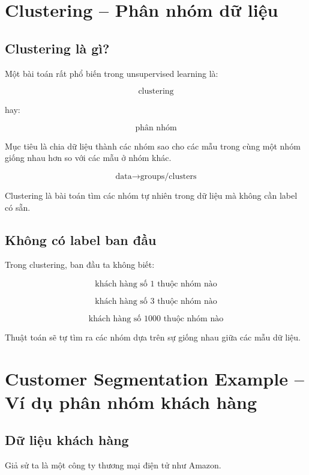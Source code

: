 \section{Clustering -- Phân nhóm dữ liệu}

\subsection{Clustering là gì?}

Một bài toán rất phổ biến trong unsupervised learning là:

\[
    \text{clustering}
\]

hay:

\[
    \text{phân nhóm}
\]

Mục tiêu là chia dữ liệu thành các nhóm sao cho các mẫu trong cùng một nhóm giống nhau hơn so với các mẫu ở nhóm khác.

\[
    \text{data}
    \rightarrow
    \text{groups/clusters}
\]

\begin{ghinho}
Clustering là bài toán tìm các nhóm tự nhiên trong dữ liệu mà không cần label có sẵn.
\end{ghinho}

\subsection{Không có label ban đầu}

Trong clustering, ban đầu ta không biết:

\[
    \text{khách hàng số 1 thuộc nhóm nào}
\]

\[
    \text{khách hàng số 3 thuộc nhóm nào}
\]

\[
    \text{khách hàng số 1000 thuộc nhóm nào}
\]

Thuật toán sẽ tự tìm ra các nhóm dựa trên sự giống nhau giữa các mẫu dữ liệu.

\section{Customer Segmentation Example -- Ví dụ phân nhóm khách hàng}

\subsection{Dữ liệu khách hàng}

Giả sử ta là một công ty thương mại điện tử như Amazon.

